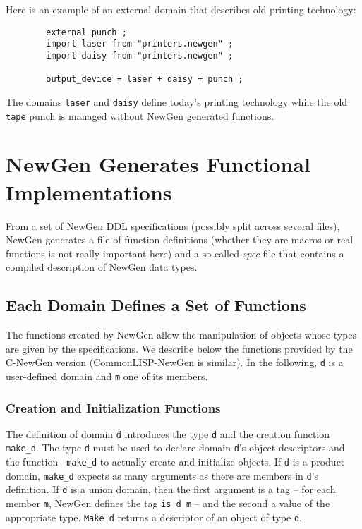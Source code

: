 Here is an example of an external domain that describes old printing
technology: 
\begin{verbatim}
        external punch ;
        import laser from "printers.newgen" ;
        import daisy from "printers.newgen" ;

        output_device = laser + daisy + punch ;
\end{verbatim}
The domains {\tt laser} and {\tt daisy} define today's printing
technology while the old {\tt tape} punch is managed without
NewGen generated functions. 

\section{NewGen Generates Functional Implementations}

From a set of NewGen DDL specifications (possibly split across
several files), NewGen generates a file of function definitions (whether
they are macros or real functions is not really important here) and a
so-called {\em spec} file that contains a compiled description of NewGen
data types.

\subsection{Each Domain Defines a Set of Functions}

The functions created by NewGen allow the manipulation of objects whose
types are given by the specifications. We describe below the functions
provided by the C-NewGen version (CommonLISP-NewGen is similar). In the
following, {\tt d} is a user-defined domain and {\tt m} one of its
members.

\subsubsection*{Creation and Initialization Functions}
The definition of domain {\tt d} introduces the type {\tt d} and the
creation function {\tt make\_d}.  The type {\tt d} must be used to
declare domain {\tt d}'s object descriptors and the function {\tt
make\_d} to actually create and initialize objects. If {\tt d} is a
product domain, {\tt make\_d} expects as many arguments as there are
members in {\tt d}'s definition. If {\tt d} is a union domain, then
the first argument is a tag -- for each member {\tt m}, NewGen defines
the tag {\tt is\_d\_m} -- and the second a value of the appropriate
type. {\tt Make\_d} returns a descriptor of an object of type {\tt d}.

